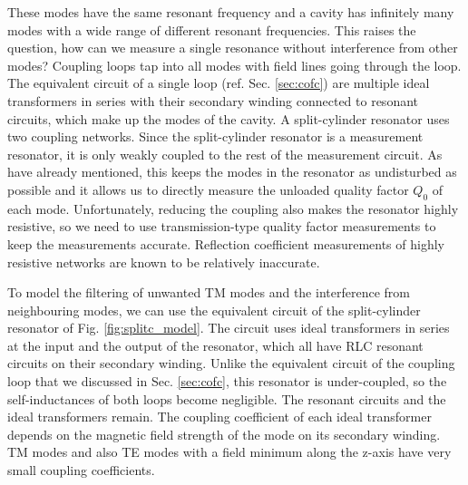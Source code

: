These modes have the same resonant frequency and a cavity has infinitely many modes with a wide range of different resonant frequencies. This raises the question, how can we measure a single resonance without interference from other modes? Coupling loops tap into all modes with field lines going through the loop. The equivalent circuit of a single loop (ref. Sec. \ref{sec:cofc}) are multiple ideal transformers in series with their secondary winding connected to resonant circuits, which make up the modes of the cavity. A split-cylinder resonator uses two coupling networks. Since the split-cylinder resonator is a measurement resonator, it is only weakly coupled to the rest of the measurement circuit. As have already mentioned, this keeps the modes in the resonator as undisturbed as possible and it allows us to directly measure the unloaded quality factor $Q_0$ of each mode. Unfortunately, reducing the coupling also makes the resonator highly resistive, so we need to use transmission-type quality factor measurements to keep the measurements accurate. Reflection coefficient measurements of highly resistive networks are known to be relatively inaccurate.

To model the filtering of unwanted TM modes and the interference from neighbouring modes, we can use the equivalent circuit of the split-cylinder resonator of Fig. \ref{fig:splitc_model}. The circuit uses ideal transformers in series at the input and the output of the resonator, which all have RLC resonant circuits on their secondary winding. Unlike the equivalent circuit of the coupling loop that we discussed in Sec. \ref{sec:cofc}, this resonator is under-coupled, so the self-inductances of both loops become negligible. The resonant circuits and the ideal transformers remain. The coupling coefficient of each ideal transformer depends on the magnetic field strength of the mode on its secondary winding. TM modes and also TE modes with a field minimum along the z-axis have very small coupling coefficients. 


